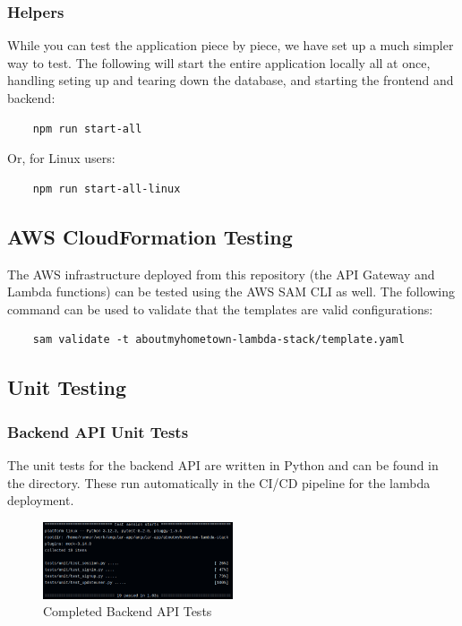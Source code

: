 \documentclass[12pt]{article}
\begin{document}
\subsubsection{Helpers}

While you can test the application piece by piece, we have set up a much simpler way to test. The following will start the entire application locally all at once, handling seting up and tearing down the database, and starting the frontend and backend:

\begin{verbatim}
    npm run start-all
\end{verbatim}

Or, for Linux users:

\begin{verbatim}
    npm run start-all-linux
\end{verbatim}

\subsection{AWS CloudFormation Testing}

The AWS infrastructure deployed from this repository (the API Gateway and Lambda functions) can be tested using the AWS SAM CLI as well. The following command can be used to validate that the templates are valid configurations:

\begin{verbatim}
    sam validate -t aboutmyhometown-lambda-stack/template.yaml
\end{verbatim}

\subsection{Unit Testing}

\subsubsection{Backend API Unit Tests}

The unit tests for the backend API are written in Python and can be found in the \href{https://github.com/AboutMyHT/angular-app/tree/main/aboutmyhometown-lambda-stack/tests}{} directory. These run automatically in the CI/CD pipeline for the lambda deployment.

\begin{figure}[htbp]
    \centering
    \includegraphics[width=0.5\textwidth]{images/completed_api_tests.png}
    \caption{Completed Backend API Tests}
    \label{fig:api-tests}
\end{figure}
\end{document}
